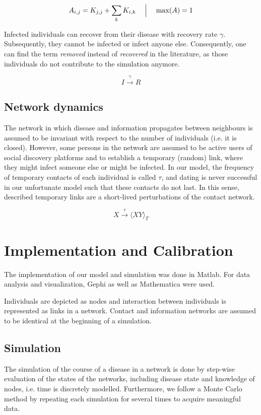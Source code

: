 \documentclass[11pt]{article}
\begin{document}
\begin{equation}
A_{i,j} = K_{j,j} + \sum_{k} K_{i,k}   \quad  \Bigm| \quad \max(A) = 1
\end{equation}

Infected individuals can recover from their disease with recovery rate $ \gamma$. Subsequently, they cannot be infected or infect anyone else. Consequently, one can find the term {\it removed} instead of {\it recovered} in the literature, as those individuals do not contribute to the simulation anymore.

\begin{equation}
I \xrightarrow\gamma R
\end{equation}

\subsection{Network dynamics}

The network in which disease and information propagates between neighbours is assumed to be invariant with respect to the number of individuals (i.e. it is closed).
However, some persons in the network are assumed to be active users of social discovery platforms and to establish a temporary (random) link, where they might infect someone else or might be infected.
In our model, the frequency of temporary contacts of each individual is called $ \tau$, and dating is never successful in our unfortunate model such that these contacts do not last. In this sense, described temporary links are a short-lived perturbations of the contact network.

\begin{equation}
X \xrightarrow\tau  \langle XY\rangle _{T}\label{eq:tau}
\end{equation}

\section{Implementation and Calibration}
The implementation of our model and simulation was done in Matlab. For data analysis and visualization, Gephi as well as Mathematica were used.

Individuals are depicted as nodes and interaction between individuals is represented as links in a network. Contact and information networks are assumed to be identical at the beginning of a simulation.

\subsection{Simulation}
The simulation of the course of a disease in a network is done by step-wise evaluation of the states of the networks, including disease state and knowledge of nodes, i.e. time is discretely modelled. Furthermore, we follow a Monte Carlo method by repeating each simulation for several times to acquire meaningful data.
\end{document}
